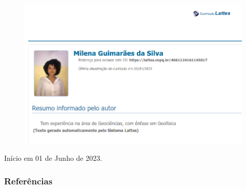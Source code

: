 \documentclass[aspectratio=169]{beamer} %
\begin{document}
{{\begin{frame}
	    \begin{figure}
		    \includegraphics[scale=0.3]{images/AlunaIC.png}
	    \end{figure}
              Início em 01 de Junho de 2023. 
\end{frame} 
}






{
\begin{frame}[allowframebreaks]
\frametitle{Referências}
\tiny


\end{frame}
}
\makeatother

{
	
}}
\end{document}
